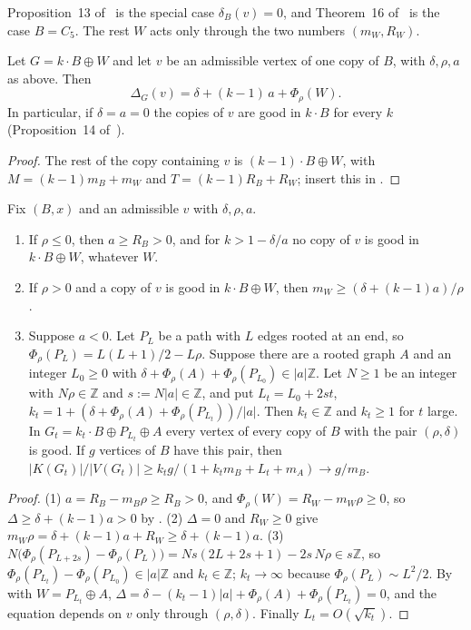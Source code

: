 \documentclass[11pt,a4paper]{report}
\begin{document}
Proposition~13 of~\autocite{GMD2026} is the special case \(\delta_B(v)=0\), and Theorem~16 of~\autocite{MG2025} is the
case \(B=C_5\). The rest \(W\) acts only through the two numbers \((m_W,R_W)\).

\begin{corollary}[note=copies]\label{cor:copies}
Let \(G=k\cdot B\oplus W\) and let \(v\) be an admissible vertex of one copy of \(B\), with \(\delta,\rho,a\) as above.
Then
\[\Delta_G(v)=\delta+(k-1)\,a+\Phi_\rho(W).\]
In particular, if \(\delta=a=0\) the copies of \(v\) are good in \(k\cdot B\) for every \(k\)
(Proposition~14 of~\autocite{GMD2026}).
\end{corollary}
\begin{proof}
The rest of the copy containing \(v\) is \((k-1)\cdot B\oplus W\), with \(M=(k-1)m_B+m_W\) and
\(T=(k-1)R_B+R_W\); insert this in .
\end{proof}

\begin{proposition}[note=three regimes]\label{prop:regimes}
Fix \((B,x)\) and an admissible \(v\) with \(\delta,\rho,a\).
\begin{enumerate}
\item If \(\rho\le0\), then \(a\ge R_B>0\), and for \(k>1-\delta/a\) no copy of \(v\) is good in \(k\cdot B\oplus W\),
whatever \(W\).
\item If \(\rho>0\) and a copy of \(v\) is good in \(k\cdot B\oplus W\), then \(m_W\ge(\delta+(k-1)a)/\rho\).
\item Suppose \(a<0\). Let \(P_L\) be a path with \(L\) edges rooted at an end, so
\(\Phi_\rho(P_L)=L(L+1)/2-L\rho\). Suppose there are a rooted graph \(A\) and an integer \(L_0\ge0\) with
\(\delta+\Phi_\rho(A)+\Phi_\rho(P_{L_0})\in|a|\mathbb Z\). Let \(N\ge1\) be an integer with \(N\rho\in\mathbb Z\) and
\(s:=N|a|\in\mathbb Z\), and put \(L_t=L_0+2st\), \(k_t=1+(\delta+\Phi_\rho(A)+\Phi_\rho(P_{L_t}))/|a|\). Then
\(k_t\in\mathbb Z\) and \(k_t\ge1\) for \(t\) large. In \(G_t=k_t\cdot B\oplus P_{L_t}\oplus A\) every vertex of every
copy of \(B\) with the pair \((\rho,\delta)\) is good. If \(g\) vertices of \(B\) have this pair, then
\(|K(G_t)|/|V(G_t)|\ge k_tg/(1+k_tm_B+L_t+m_A)\to g/m_B\).
\end{enumerate}
\end{proposition}
\begin{proof}
(1) \(a=R_B-m_B\rho\ge R_B>0\), and \(\Phi_\rho(W)=R_W-m_W\rho\ge0\), so
\(\Delta\ge\delta+(k-1)a>0\) by . (2) \(\Delta=0\) and \(R_W\ge0\) give
\(m_W\rho=\delta+(k-1)a+R_W\ge\delta+(k-1)a\). (3) \(N\bigl(\Phi_\rho(P_{L+2s})-\Phi_\rho(P_L)\bigr)
=Ns(2L+2s+1)-2s\,N\rho\in s\mathbb Z\), so \(\Phi_\rho(P_{L_t})-\Phi_\rho(P_{L_0})\in|a|\mathbb Z\) and
\(k_t\in\mathbb Z\); \(k_t\to\infty\) because \(\Phi_\rho(P_L)\sim L^2/2\). By  with
\(W=P_{L_t}\oplus A\), \(\Delta=\delta-(k_t-1)|a|+\Phi_\rho(A)+\Phi_\rho(P_{L_t})=0\), and the equation depends on
\(v\) only through \((\rho,\delta)\). Finally \(L_t=O(\sqrt{k_t})\).
\end{proof}
\end{document}
